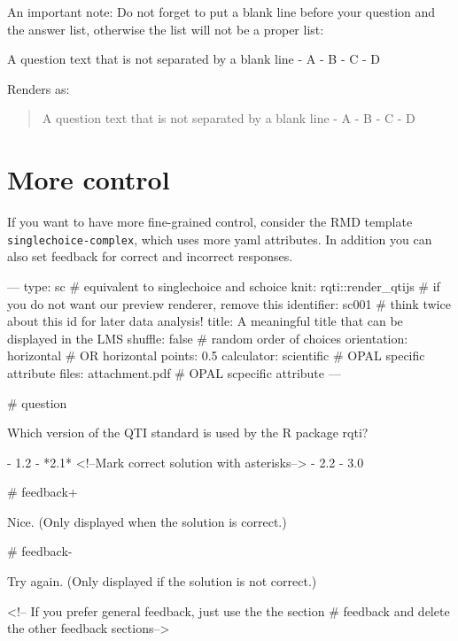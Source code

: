 \documentclass[twoside]{tufte-book}
\newenvironment{Shaded}{}{}
\newcommand{\NormalTok}[1]{#1}
\begin{document}
An important note: Do not forget to put a blank line before your question and the answer list, otherwise the list will not be a proper list:

\begin{Shaded}
\begin{Highlighting}[]
\NormalTok{A question text that is not separated by a blank line}
\NormalTok{{-} A}
\NormalTok{{-} B}
\NormalTok{{-} C}
\NormalTok{{-} D}
\end{Highlighting}
\end{Shaded}

Renders as:

\begin{quote}
A question text that is not separated by a blank line - A - B - C - D
\end{quote}

\section{More control}\label{more-control}

If you want to have more fine-grained control, consider the RMD template \texttt{singlechoice-complex}, which uses more yaml attributes. In addition you can also set feedback for correct and incorrect responses.

\begin{Shaded}
\begin{Highlighting}
---
type: sc # equivalent to singlechoice and schoice
knit: rqti::render_qtijs # if you do not want our preview renderer, remove this
identifier: sc001 # think twice about this id for later data analysis!
title: A meaningful title that can be displayed in the LMS
shuffle: false # random order of choices
orientation: horizontal # OR horizontal
points: 0.5
calculator: scientific # OPAL specific attribute
files: attachment.pdf # OPAL scpecific attribute
---

# question

Which version of the QTI standard is used by the R package rqti?

- 1.2
- *2.1* <!--Mark correct solution with asterisks-->
- 2.2
- 3.0

# feedback+

Nice. (Only displayed when the solution is correct.)

# feedback-

Try again. (Only displayed if the solution is not correct.)

<!-- If you prefer general feedback, just use the the section # feedback and
delete the other feedback sections-->
\end{Highlighting}
\end{Shaded}
\end{document}
